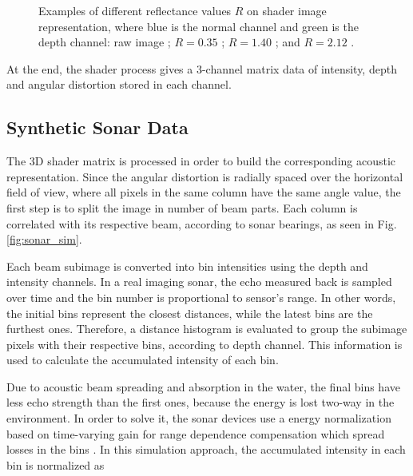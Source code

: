 \documentclass[final,5p,times]{elsarticle}
\begin{document}
\begin{figure}[h]
{        \label{fig:reflectance:2.12}
    }
    \captionsetup{justification=centering}
    \caption{Examples of different reflectance values $R$ on shader image representation, where blue is the normal channel and green is the depth channel: raw image ; $R = 0.35$ ; $R = 1.40$ ; and $R = 2.12$ .}
    \label{fig:sonar_reflectances}
\end{figure}

At the end, the shader process gives a 3-channel matrix data of intensity, depth and angular distortion stored in each channel.


\subsection{Synthetic Sonar Data}
\label{dev:sonardata}

The 3D shader matrix is processed in order to build the corresponding acoustic representation. Since the angular distortion is radially spaced over the horizontal field of view, where all pixels in the same column have the same angle value, the first step is to split the image in number of beam parts. Each column is correlated with its respective beam, according to sonar bearings, as seen in Fig. \ref{fig:sonar_sim}.

Each beam subimage is converted into bin intensities using the depth and intensity channels. In a real imaging sonar, the echo measured back is sampled over time and the bin number is proportional to sensor's range. In other words, the initial bins represent the closest distances, while the latest bins are the furthest ones. Therefore, a distance histogram is evaluated to group the subimage pixels with their respective bins, according to depth channel. This information is used to calculate the accumulated intensity of each bin.

Due to acoustic beam spreading and absorption in the water, the final bins have less echo strength than the first ones, because the energy is lost two-way in the environment. In order to solve it, the sonar devices use a energy normalization based on time-varying gain for range dependence compensation which spread losses in the bins \cite{urick2013}. In this simulation approach, the accumulated intensity in each bin is normalized as
\end{document}
